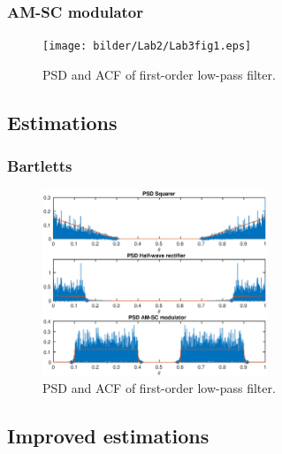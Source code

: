 \subsubsection{AM-SC modulator}

\begin{figure}[h]
\centering
\texttt{[image: bilder/Lab2/Lab3fig1.eps]}
\caption{PSD and ACF of first-order low-pass filter.}
\label{fig:Lab1fig1}
\end{figure}


\subsection{Estimations}

\subsubsection{Bartletts}
\begin{figure}[h]
\centering
\includegraphics[width=0.6\textwidth]{bilder/Lab2/Lab2fig7.eps}
\caption{PSD and ACF of first-order low-pass filter.}
\label{fig:Lab1fig1}
\end{figure}


\subsection{Improved estimations}


